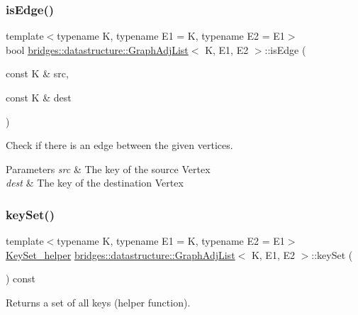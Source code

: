 \subsubsection{\texorpdfstring{is\+Edge()}{isEdge()}}
{\footnotesize\ttfamily template$<$typename K, typename E1 = K, typename E2 = E1$>$ \\
bool \hyperlink{classbridges_1_1datastructure_1_1_graph_adj_list}{bridges\+::datastructure\+::\+Graph\+Adj\+List}$<$ K, E1, E2 $>$\+::is\+Edge (\begin{DoxyParamCaption}\item[{const K \&}]{src,  }\item[{const K \&}]{dest }\end{DoxyParamCaption})\hspace{0.3cm}{\ttfamily [inline]}}



Check if there is an edge between the given vertices. 


\begin{DoxyParams}{Parameters}
{\em src} & The key of the source Vertex \\
\hline
{\em dest} & The key of the destination Vertex \\
\hline
\end{DoxyParams}
\mbox{\label{classbridges_1_1datastructure_1_1_graph_adj_list_a0562e8d82499f26ad656a1dfb5f8908e}} 
\subsubsection{\texorpdfstring{key\+Set()}{keySet()}}
{\footnotesize\ttfamily template$<$typename K, typename E1 = K, typename E2 = E1$>$ \\
\hyperlink{classbridges_1_1datastructure_1_1_graph_adj_list_1_1_key_set__helper}{Key\+Set\+\_\+helper} \hyperlink{classbridges_1_1datastructure_1_1_graph_adj_list}{bridges\+::datastructure\+::\+Graph\+Adj\+List}$<$ K, E1, E2 $>$\+::key\+Set (\begin{DoxyParamCaption}{ }\end{DoxyParamCaption}) const\hspace{0.3cm}{\ttfamily [inline]}}

Returns a set of all keys (helper function).


